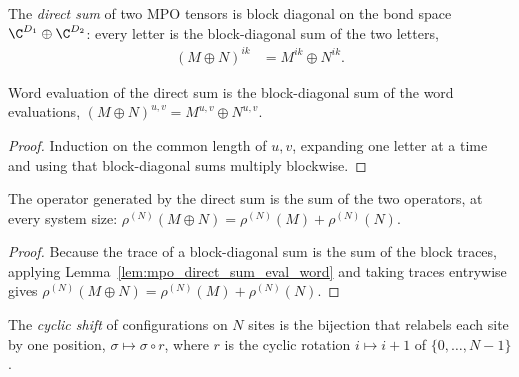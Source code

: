 \begin{definition}\label{def:mpo_direct_sum}
    \leanok
    The \emph{direct sum} of two MPO tensors is block diagonal on the bond
    space $\C^{D_1}\oplus\C^{D_2}$: every letter is the block-diagonal sum
    of the two letters,
    \begin{align}
        (M\oplus N)^{ik}
         & =M^{ik}\oplus N^{ik}.
        \label{eq:mpdo_direct_sum}
    \end{align}
\end{definition}

\begin{lemma}\label{lem:mpo_direct_sum_eval_word}
    \leanok
    Word evaluation of the direct sum is the block-diagonal sum of the word
    evaluations,
    $(M\oplus N)^{u,v}=M^{u,v}\oplus N^{u,v}$.
\end{lemma}

\begin{proof}\leanok{}
    Induction on the common length of $u,v$, expanding one letter at a time
    and using that block-diagonal sums multiply blockwise.
\end{proof}

\begin{lemma}\label{thm:mpo_direct_sum_additive}
    \leanok
    The operator generated by the direct sum is the sum of the two
    operators, at every system size:
    $\rho^{(N)}(M\oplus N)=\rho^{(N)}(M)+\rho^{(N)}(N)$.
\end{lemma}

\begin{proof}\leanok{}
    Because the trace of a block-diagonal sum is the sum of the block traces,
    applying Lemma~\ref{lem:mpo_direct_sum_eval_word} and taking traces
    entrywise gives $\rho^{(N)}(M\oplus N)=\rho^{(N)}(M)+\rho^{(N)}(N)$.
\end{proof}

\begin{definition}\label{def:mpo_rotate_config}
    \leanok
    The \emph{cyclic shift} of configurations on $N$ sites is the bijection that
    relabels each site by one position, $\sigma\mapsto\sigma\circ r$, where
    $r$ is the cyclic rotation $i\mapsto i+1$ of $\{0,\ldots,N-1\}$.
\end{definition}

